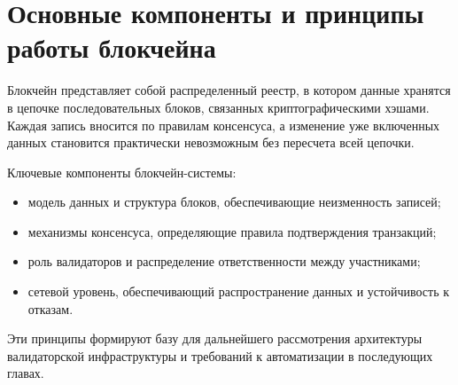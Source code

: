 \section{Основные компоненты и принципы работы блокчейна}\label{sec:ch1/sec2}

Блокчейн представляет собой распределенный реестр, в котором данные хранятся в
цепочке последовательных блоков, связанных криптографическими хэшами. Каждая
запись вносится по правилам консенсуса, а изменение уже включенных данных
становится практически невозможным без пересчета всей цепочки.

Ключевые компоненты блокчейн-системы:
\begin{itemize}
  \item модель данных и структура блоков, обеспечивающие неизменность записей;
  \item механизмы консенсуса, определяющие правила подтверждения транзакций;
  \item роль валидаторов и распределение ответственности между участниками;
  \item сетевой уровень, обеспечивающий распространение данных и устойчивость к
  отказам.
\end{itemize}

Эти принципы формируют базу для дальнейшего рассмотрения архитектуры валидаторской
инфраструктуры и требований к автоматизации в последующих главах.
